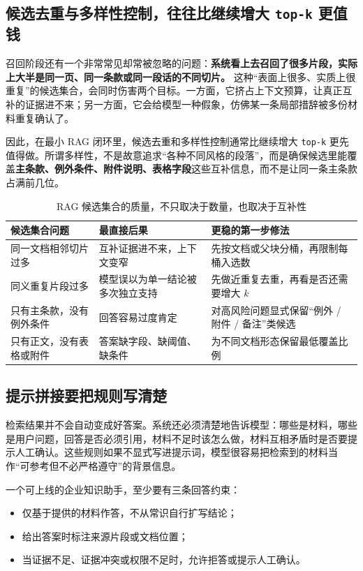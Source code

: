 \subsection{候选去重与多样性控制，往往比继续增大 \texttt{top-k} 更值钱}
召回阶段还有一个非常常见却常被忽略的问题：\textbf{系统看上去召回了很多片段，实际上大半是同一页、同一条款或同一段话的不同切片。} 这种“表面上很多、实质上很重复”的候选集合，会同时伤害两个目标。一方面，它挤占上下文预算，让真正互补的证据进不来；另一方面，它会给模型一种假象，仿佛某一条局部措辞被多份材料重复确认了。

因此，在最小 RAG 闭环里，候选去重和多样性控制通常比继续增大 \texttt{top-k} 更先值得做。所谓多样性，不是故意追求“各种不同风格的段落”，而是确保候选里能覆盖\textbf{主条款、例外条件、附件说明、表格字段}这些互补信息，而不是让同一条主条款占满前几位。

\begin{table}[H]
\centering
\small
\begin{tabularx}{\textwidth}{>{\raggedright\arraybackslash}p{2.8cm}>{\raggedright\arraybackslash}p{3cm}>{\raggedright\arraybackslash}X}
\toprule
\textbf{候选集合问题} & \textbf{最直接后果} & \textbf{更稳的第一步修法} \\
\midrule
同一文档相邻切片过多 & 互补证据进不来，上下文变窄 & 先按文档或父块分桶，再限制每桶入选数 \\
同义重复片段过多 & 模型误以为单一结论被多次独立支持 & 先做近重复去重，再看是否还需要增大 \(k\) \\
只有主条款，没有例外条件 & 回答容易过度肯定 & 对高风险问题显式保留“例外 / 附件 / 备注”类候选 \\
只有正文，没有表格或附件 & 答案缺字段、缺阈值、缺条件 & 为不同文档形态保留最低覆盖比例 \\
\bottomrule
\end{tabularx}
\caption{RAG 候选集合的质量，不只取决于数量，也取决于互补性}
\label{tab:rag-candidate-diversity}
\end{table}

\subsection{提示拼接要把规则写清楚}
检索结果并不会自动变成好答案。系统还必须清楚地告诉模型：哪些是材料，哪些是用户问题，回答是否必须引用，材料不足时该怎么做，材料互相矛盾时是否要提示人工确认。这些规则如果不显式写进提示词，模型很容易把检索到的材料当作“可参考但不必严格遵守”的背景信息。

一个可上线的企业知识助手，至少要有三条回答约束：
\begin{itemize}
  \item 仅基于提供的材料作答，不从常识自行扩写结论；
  \item 给出答案时标注来源片段或文档位置；
  \item 当证据不足、证据冲突或权限不足时，允许拒答或提示人工确认。
\end{itemize}

